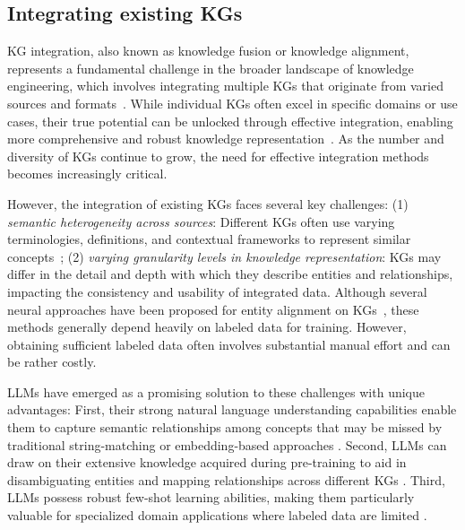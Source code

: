 \subsection{Integrating existing KGs}
KG integration, also known as knowledge fusion or knowledge alignment, represents a fundamental challenge in the broader landscape of knowledge engineering, which involves integrating multiple KGs that originate from varied sources and formats~\cite{yan2024knownet,lu2022open}.
While individual KGs often excel in specific domains or use cases, their true potential can be unlocked through effective integration, enabling more comprehensive and robust knowledge representation~\cite{himmelstein2017systematic,santos2020clinical}. 
As the number and diversity of KGs continue to grow, the need for effective integration methods becomes increasingly critical.

However, the integration of existing KGs faces several key challenges: (1) \textit{semantic heterogeneity across sources}: Different KGs often use varying terminologies, definitions, and contextual frameworks to represent similar concepts~\cite{liu2022selfkg}; 
(2) \textit{varying granularity levels in knowledge representation}: KGs may differ in the detail and depth with which they describe entities and relationships, impacting the consistency and usability of integrated data. 
Although several neural approaches have been proposed for entity alignment on KGs~\cite{wang2018cross,zhu2020collective,yan2021dynamic}, these methods generally depend heavily on labeled data for training. However, obtaining sufficient labeled data often involves substantial manual effort and can be rather costly.

LLMs have emerged as a promising solution to these challenges with unique advantages: 
First, their strong natural language understanding capabilities enable them to capture semantic relationships among concepts that may be missed by traditional string-matching or embedding-based approaches \cite{chen2023dipping}. 
Second, LLMs can draw on their extensive knowledge acquired during pre-training to aid in disambiguating entities and mapping relationships across different KGs \cite{sancheti2024llm}.
Third, LLMs possess robust few-shot learning abilities, making them particularly valuable for specialized domain applications where labeled data are limited \cite{brown2020language,agrawal2022large}.

